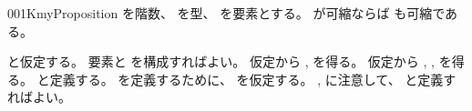 \documentclass[index]{subfiles}
\begin{document}
\begin{myBlock}{001K}{myProposition}
  を階数、
  を型、
  を要素とする。
  が可縮ならば
  も可縮である。
\end{myBlock}
\begin{myProof}
  と仮定する。
  要素と
  を構成すればよい。
  仮定から
  ,
  を得る。
  仮定から
  ,
  ,
  を得る。
  と定義する。
  を定義するために、
  を仮定する。
  ,
  に注意して、
  と定義すればよい。
\end{myProof}
\end{document}
